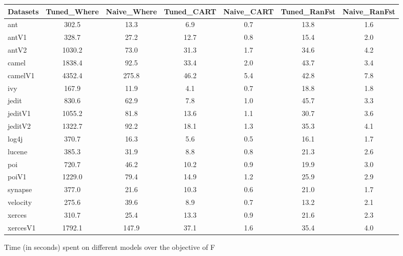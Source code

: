 \documentclass{sig-alternative}
\def\baselinestretch{1}
\begin{document}
\begin{figure}[!ht]

\renewcommand{\baselinestretch}{0.7}
\scriptsize
\centering
  \begin{tabular}{l|c |c |c |c |c |c }
    \hline\hline
    Datasets & Tuned\_Where & Naive\_Where & Tuned\_CART & Naive\_CART & Tuned\_RanFst & Naive\_RanFst\\
    \hline
    ant & 302.5 & 13.3 & 6.9 & 0.7 & 13.8 & 1.6\\
    antV1 & 328.7 & 27.2 & 12.7 & 0.8 & 15.4 & 2.0\\
    antV2 & 1030.2 & 73.0 & 31.3 & 1.7 & 34.6 & 4.2\\
    camel & 1838.4 & 92.5 & 33.4 & 2.0 & 43.7 & 3.4\\
    camelV1 & 4352.4 & 275.8 & 46.2 & 5.4 & 42.8 & 7.8\\
    ivy & 167.9 & 11.9 & 4.1 & 0.7 & 18.8 & 1.8\\
    jedit & 830.6 & 62.9 & 7.8 & 1.0 & 45.7 & 3.3\\
    jeditV1 & 1055.2 & 81.8 & 13.6 & 1.1 & 30.7 & 3.6\\
    jeditV2 & 1322.7 & 92.2 & 18.1 & 1.3 & 35.3 & 4.1\\
    log4j & 370.7 & 16.3 & 5.6 & 0.5 & 16.1 & 1.7\\
    lucene & 385.3 & 31.9 & 8.8 & 0.8 & 21.3 & 2.6\\
    poi & 720.7 & 46.2 & 10.2 & 0.9 & 19.9 & 3.0\\
    poiV1 & 1229.0 & 79.4 & 14.9 & 1.2 & 25.9 & 2.9\\
    synapse & 377.0 & 21.6 & 10.3 & 0.6 & 21.0 & 1.7\\
    velocity & 275.6 & 39.6 & 8.9 & 0.7 & 13.2 & 2.1\\
    xerces & 310.7 & 25.4 & 13.3 & 0.9 & 21.6 & 2.3\\
    xercesV1 & 1792.1 & 147.9 & 37.1 & 1.6 & 35.4 & 4.0\\
  \end{tabular}
  \caption{Time (in seconds) spent on different models over the objective of F}
\end{figure}
\end{document}
